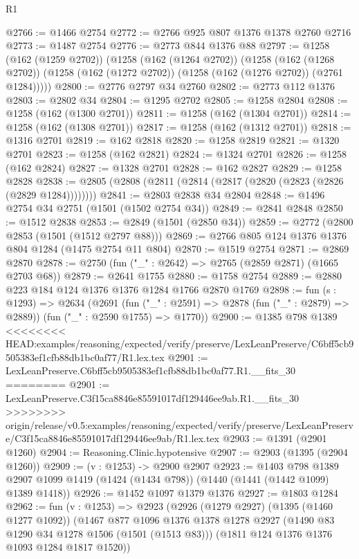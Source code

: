 \begin{lexlean}{R1}
\begin{coremodule}
{{{{{{{{{{{{{{{{{{{{{{{{{{{{{{{{{{{{{{{{{{{{{{{{{{{{{{{{{{{{{{{{{{{{{{{{{{{{{{{{{{{{{{{{{{@2766 := @1466 @2754
@2772 := @2766 @925 @807 @1376 @1378 @2760 @2716
@2773 := @1487 @2754
@2776 := @2773 @844 @1376 @88
@2797 := @1258
    (@162 (@1259 @2702))
    (@1258
      (@162 (@1264 @2702))
      (@1258
        (@162 (@1268 @2702))
        (@1258 (@162 (@1272 @2702)) (@1258 (@162 (@1276 @2702)) (@2761 @1284)))))
@2800 := @2776 @2797 @34 @2760
@2802 := @2773 @112 @1376
@2803 := @2802 @34
@2804 := @1295 @2702
@2805 := @1258 @2804
@2808 := @1258 (@162 (@1300 @2701))
@2811 := @1258 (@162 (@1304 @2701))
@2814 := @1258 (@162 (@1308 @2701))
@2817 := @1258 (@162 (@1312 @2701))
@2818 := @1316 @2701
@2819 := @162 @2818
@2820 := @1258 @2819
@2821 := @1320 @2701
@2823 := @1258 (@162 @2821)
@2824 := @1324 @2701
@2826 := @1258 (@162 @2824)
@2827 := @1328 @2701
@2828 := @162 @2827
@2829 := @1258 @2828
@2838 := @2805 (@2808 (@2811 (@2814 (@2817 (@2820 (@2823 (@2826 (@2829 @1284))))))))
@2841 := @2803 @2838 @34 @2804
@2848 := @1496 @2754 @34 @2751 (@1501 (@1502 @2754 @34))
@2849 := @2841 @2848
@2850 := @1512 @2838
@2853 := @2849 (@1501 (@2850 @34))
@2859 := @2772 (@2800 @2853 (@1501 (@1512 @2797 @88)))
@2869 := @2766 @805 @124 @1376 @1376 @804 @1284 (@1475 @2754 @11 @804)
@2870 := @1519 @2754
@2871 := @2869 @2870
@2878 := @2750 (fun ("_" : @2642) => @2765 (@2859 @2871) (@1665 @2703 @68))
@2879 := @2641 @1755
@2880 := @1758 @2754
@2889 := @2880 @223 @184 @124 @1376 @1376 @1284 @1766 @2870 @1769
@2898 := fun (s : @1293) =>
  @2634
    (@2691
      (fun ("_" : @2591) => @2878 (fun ("_" : @2879) => @2889))
      (fun ("_" : @2590 @1755) => @1770))
@2900 := @1385 @798 @1389
<<<<<<<< HEAD:examples/reasoning/expected/verify/preserve/LexLeanPreserve/C6bff5cb9505383ef1cfb88db1bc0af77/R1.lex.tex
@2901 := LexLeanPreserve.C6bff5cb9505383ef1cfb88db1bc0af77.R1.__fits_30
========
@2901 := LexLeanPreserve.C3f15ca8846e85591017df129446ee9ab.R1.__fits_30
>>>>>>>> origin/release/v0.5:examples/reasoning/expected/verify/preserve/LexLeanPreserve/C3f15ca8846e85591017df129446ee9ab/R1.lex.tex
@2903 := @1391 (@2901 @1260)
@2904 := Reasoning.Clinic.hypotensive
@2907 := @2903 (@1395 (@2904 @1260))
@2909 := (v : @1253) -> @2900 @2907
@2923 := @1403
    @798
    @1389
    @2907
    @1099
    @1419
    (@1424 (@1434 @798))
    (@1440 (@1441 (@1442 @1099) @1389 @1418))
@2926 := @1452 @1097 @1379 @1376
@2927 := @1803 @1284
@2962 := fun (v : @1253) =>
  @2923
    (@2926
      (@1279 @2927)
      (@1395 (@1460 @1277 @1092))
      (@1467
        @877
        @1096
        @1376
        @1378
        @1278
        @2927
        (@1490 @83 @1290 @34 @1278 @1506 (@1501 (@1513 @83)))
        (@1811 @124 @1376 @1376 @1093 @1284 @1817 @1520))
}}}}}}}}}}}}}}}}}}}}}}}}}}}}}}}}}}}}}}}}}}}}}}}}}}}}}}}}}}}}}}}}}}}}}}}}}}}}}}}}}}}}}}}}}}
\end{coremodule}
\end{lexlean}
